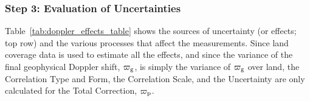 
\subsubsection{Step 3: Evaluation of Uncertainties}

Table~\ref{tab:doppler_effects_table} shows the sources of uncertainty (or
effects; top row) and the various processes that affect the measurements. Since
land coverage data is used to estimate all the effects, and since the variance
of the final geophysical Doppler shift, $\varpi_{\rm g}$, is simply the
variance of $\varpi_{\rm g}$ over land, the Correlation Type and Form, the
Correlation Scale, and the Uncertainty are only calculated for the Total
Correction, $\varpi_{\rm p}$.

\begin{table}[ht]
  \scriptsize
  \centering

  \caption{Uncertainty effects table for the geophysical Doppler shift,
  $\varpi_{\rm g}$.}


\end{table}
